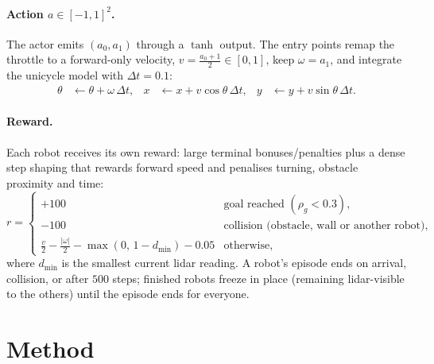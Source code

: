 \documentclass[11pt,a4paper]{article}
\begin{document}
\paragraph{Action $a\in[-1,1]^2$.}
The actor emits $(a_0, a_1)$ through a $\tanh$ output. The entry points remap
the throttle to a forward-only velocity, $v = \tfrac{a_0+1}{2}\in[0,1]$, keep
$\omega = a_1$, and integrate the unicycle model with $\Delta t = 0.1$:
\begin{align}
\theta &\leftarrow \theta + \omega\,\Delta t, &
x &\leftarrow x + v\cos\theta\,\Delta t, &
y &\leftarrow y + v\sin\theta\,\Delta t.
\end{align}

\paragraph{Reward.}
Each robot receives its own reward: large terminal bonuses/penalties plus a
dense step shaping that rewards forward speed and penalises turning,
obstacle proximity and time:
\begin{equation}
r =
\begin{cases}
+100 & \text{goal reached } (\rho_g < 0.3),\\
-100 & \text{collision (obstacle, wall or another robot)},\\
\tfrac{v}{2} - \tfrac{|\omega|}{2}
  - \max(0,\,1 - d_{\min}) - 0.05 & \text{otherwise,}
\end{cases}
\end{equation}
where $d_{\min}$ is the smallest current lidar reading. A robot's episode
ends on arrival, collision, or after $500$ steps; finished robots freeze in
place (remaining lidar-visible to the others) until the episode ends for
everyone.

\section{Method}
\end{document}
